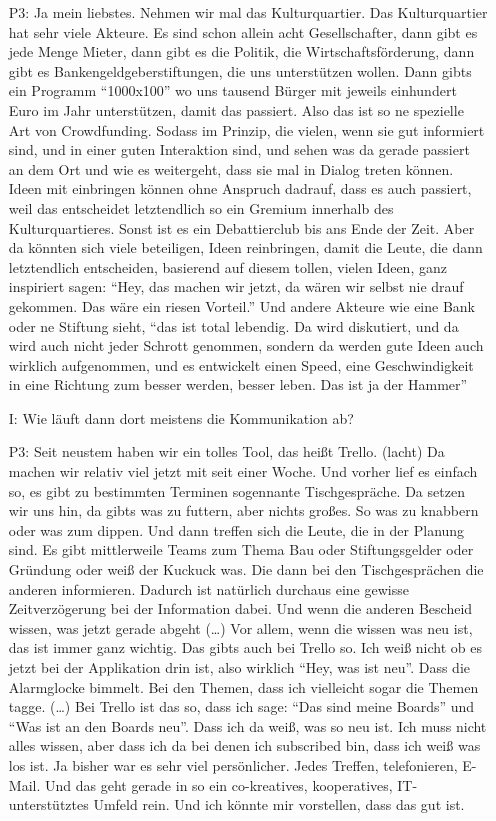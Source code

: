 \begin{itemize}
    \item[P3:] Ja mein liebstes. Nehmen wir mal das Kulturquartier. Das Kulturquartier hat sehr viele Akteure. Es sind schon allein acht Gesellschafter, dann gibt es jede Menge Mieter, dann gibt es die Politik, die Wirtschaftsf{\"o}rderung, dann gibt es Bankengeldgeberstiftungen, die uns unterst{\"u}tzen wollen. Dann gibts ein Programm "`1000x100"' wo uns tausend B{\"u}rger mit jeweils einhundert Euro im Jahr unterst{\"u}tzen, damit das passiert. Also das ist so ne spezielle Art von Crowdfunding. Sodass im Prinzip, die vielen, wenn sie gut informiert sind, und in einer guten Interaktion sind, und sehen was da gerade passiert an dem Ort und wie es weitergeht, dass sie mal in Dialog treten k{\"o}nnen. Ideen mit einbringen k{\"o}nnen ohne Anspruch dadrauf, dass es auch passiert, weil das entscheidet letztendlich so ein Gremium innerhalb des Kulturquartieres. Sonst ist es ein Debattierclub bis ans Ende der Zeit. Aber da k{\"o}nnten sich viele beteiligen, Ideen reinbringen, damit die Leute, die dann letztendlich entscheiden, basierend auf diesem tollen, vielen Ideen, ganz inspiriert sagen: "`Hey, das machen wir jetzt, da w{\"a}ren wir selbst nie drauf gekommen. Das w{\"a}re ein riesen Vorteil."' Und andere Akteure wie eine Bank oder ne Stiftung sieht, "`das ist total lebendig. Da wird diskutiert, und da wird auch nicht jeder Schrott genommen, sondern da werden gute Ideen auch wirklich aufgenommen, und es entwickelt einen Speed, eine Geschwindigkeit in eine Richtung zum besser werden, besser leben. Das ist ja der Hammer"'
    \item[I:] Wie l{\"a}uft dann dort meistens die Kommunikation ab?
    \item[P3:] Seit neustem haben wir ein tolles Tool, das hei{\ss}t Trello. (lacht) Da machen wir relativ viel jetzt mit seit einer Woche. Und vorher lief es einfach so, es gibt zu bestimmten Terminen sogennante Tischgespr{\"a}che. Da setzen wir uns hin, da gibts was zu futtern, aber nichts gro{\ss}es. So was zu knabbern oder was zum dippen. Und dann treffen sich die Leute, die in der Planung sind. Es gibt mittlerweile Teams zum Thema Bau oder Stiftungsgelder oder Gr{\"u}ndung oder wei{\ss} der Kuckuck was. Die dann bei den Tischgespr{\"a}chen die anderen informieren. Dadurch ist nat{\"u}rlich durchaus eine gewisse Zeitverz{\"o}gerung bei der Information dabei. Und wenn die anderen Bescheid wissen, was jetzt gerade abgeht (\dots) Vor allem, wenn die wissen was neu ist, das ist immer ganz wichtig. Das gibts auch bei Trello so. Ich wei{\ss} nicht ob es jetzt bei der Applikation drin ist, also wirklich "`Hey, was ist neu"'. Dass die Alarmglocke bimmelt. Bei den Themen, dass ich vielleicht sogar die Themen tagge. (\dots) Bei Trello ist das so, dass ich sage: "`Das sind meine Boards"' und "`Was ist an den Boards neu"'. Dass ich da wei{\ss}, was so neu ist. Ich muss nicht alles wissen, aber dass ich da bei denen ich subscribed bin, dass ich wei{\ss} was los ist. Ja bisher war es sehr viel pers{\"o}nlicher. Jedes Treffen, telefonieren, E-Mail. Und das geht gerade in so ein co-kreatives, kooperatives, IT-unterst{\"u}tztes Umfeld rein. Und ich k{\"o}nnte mir vorstellen, dass	das gut ist.

\end{itemize}

